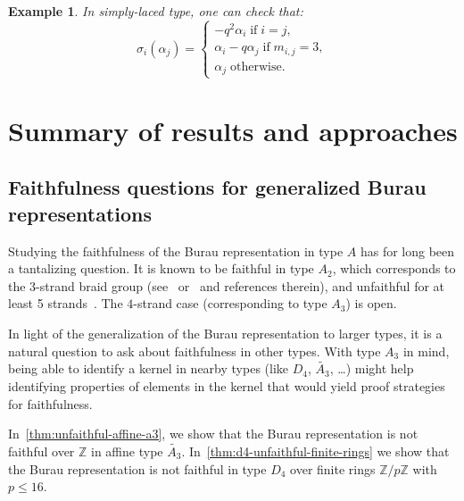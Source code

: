 \documentclass[a4paper]{amsart}
\newcommand{\Z}{\mathbb{Z}}
\newcommand{\0}{\mathbf{0}}
\renewcommand{\tilde}{\widetilde}
\theoremstyle{theorem}
\newtheorem{example}[theorem]{Example}
\begin{document}
\begin{example}
  In simply-laced type, one can check that:
  \[
    \sigma_i(\alpha_j)=\begin{cases} -q^2\alpha_i \;\text{if}\; i=j, \\
      \alpha_i-q\alpha_j \;\text{if}\; m_{i,j}=3, \\
      \alpha_j\;\text{otherwise}.
      \end{cases}
    \]
\end{example}


\section{Summary of results and approaches}

\subsection{Faithfulness questions for generalized Burau representations}

Studying the faithfulness of the Burau representation in type $A$ has for long been a tantalizing question.
It is known to be faithful in type \(A_2\), which corresponds to the 3-strand braid group (see~\cite{MagnusPeluso} or~\cite{Birman_book} and references therein), and unfaithful for at least 5 strands~\cite{Moody, LongPaton,Bigelow_Burau}.
The $4$-strand case (corresponding to type \(A_3\)) is open.

In light of the generalization of the Burau representation to larger types, it is a natural question to ask about faithfulness in other types. With type $A_3$ in mind, being able to identify a kernel in nearby types (like $D_4$, $\tilde{A_3}$, \dots) might help identifying properties of elements in the kernel that would yield proof strategies for faithfulness.

In~\cref{thm:unfaithful-affine-a3}, we show that the Burau representation is not faithful over \(\mathbb{Z}\) in affine type $\tilde{A_3}$.
In~\cref{thm:d4-unfaithful-finite-rings} we show that the Burau representation is not faithful in type $D_4$ over finite rings $\Z/p\Z$ with $p\leq 16$.
\end{document}
